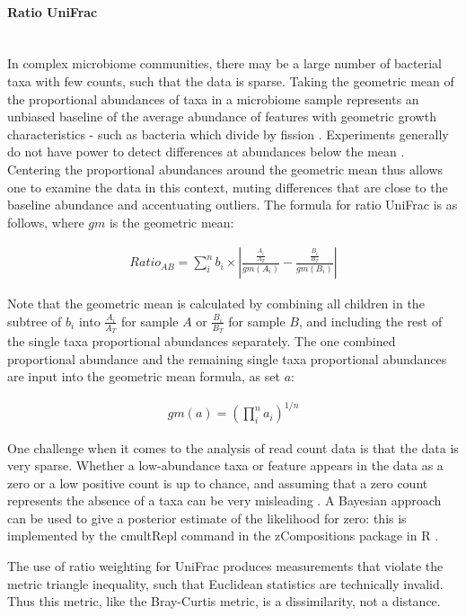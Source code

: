 \documentclass[10pt,letterpaper]{article}
\begin{document}
\paragraph{Ratio UniFrac}\mbox{}\\
In complex microbiome communities, there may be a large number of bacterial taxa with few counts, such that the data is sparse. Taking the geometric mean of the proportional abundances of taxa in a microbiome sample represents an unbiased baseline of the average abundance of features with geometric growth characteristics - such as bacteria which divide by fission \cite{aitchison1982statistical}. Experiments generally do not have power to detect differences at abundances below the mean \cite{fernandes2013anova}. Centering the proportional abundances around the geometric mean thus allows one to examine the data in this context, muting differences that are close to the baseline abundance and accentuating outliers. The formula for ratio UniFrac is as follows, where $gm$ is the geometric mean:

\begin{align*}
Ratio_{AB} = \sum_{i}^{n} b_{i} \times \left| \frac{\frac{A_{i}}{A_{T}}}{gm(A_{i})} - \frac{\frac{B_{i}}{B_{T}}}{{gm(B_{i})}} \right|
\end{align*}

Note that the geometric mean is calculated by combining all children in the subtree of $b_{i}$ into $\frac{A_{i}}{A_{T}}$ for sample $A$ or $\frac{B_{i}}{B_{T}}$ for sample $B$, and including the rest of the single taxa proportional abundances separately. The one combined proportional abundance and the remaining single taxa proportional abundances are input into the geometric mean formula, as set $a$:

\begin{align*}
gm(a) = \left( \prod_{i}^{n} a_{i}\right)^{1/n}
\end{align*}

One challenge when it comes to the analysis of read count data is that the data is very sparse. Whether a low-abundance taxa or feature appears in the data as a zero or a low positive count is up to chance, and assuming that a zero count represents the absence of a taxa can be very misleading \cite{fernandes2013anova}. A Bayesian approach can be used to give a posterior estimate of the likelihood for zero: this is implemented by the cmultRepl command in the zCompositions package in R \cite{palarea2015zcompositions}.

The use of ratio weighting for UniFrac produces measurements that violate the metric triangle inequality, such that Euclidean statistics are technically invalid. Thus this metric, like the Bray-Curtis metric, is a dissimilarity, not a distance.
\end{document}
